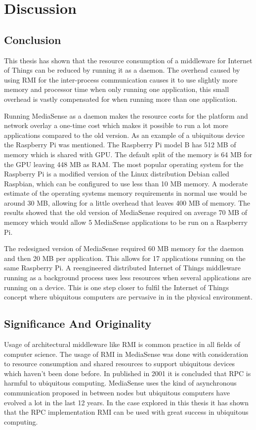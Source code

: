 \chapter{Discussion}

\section{Conclusion}
This thesis has shown that the resource consumption of a middleware for Internet of Things can be reduced by running it as a daemon. The overhead caused by using RMI for the inter-process communication causes it to use slightly more memory and processor time when only running one application, this small overhead is vastly compensated for when running more than one application. 

Running MediaSense as a daemon makes the resource costs for the platform and network overlay a one-time cost which makes it possible to run a lot more applications compared to the old version. As an example of a ubiquitous device the Raspberry Pi \cite{rpiweb} was mentioned. The Raspberry Pi model B has 512 MB of memory which is shared with GPU. The default split of the memory is 64 MB for the GPU leaving 448 MB as RAM. The most popular operating system for the Raspberry Pi is a modified version of the Linux distribution Debian called Raspbian, which can be configured to use less than 10 MB memory. A moderate estimate of the operating systems memory requirements in normal use would be around 30 MB, allowing for a little overhead that leaves 400 MB of memory. The results showed that the old version of MediaSense required on average 70 MB of memory which would allow 5 MediaSense applications to be run on a Raspberry Pi.

The redesigned version of MediaSense required 60 MB memory for the daemon and then 20 MB per application. This allows for 17 applications running on the same Raspberry Pi.
A reengineered distributed Internet of Things middleware running as a background process uses less resources when several applications are running on a device. This is one step closer to fulfil the Internet of Things concept where ubiquitous computers are pervasive in in the physical environment.

\section{Significance And Originality}
Usage of architectural middleware like RMI is common practice in all fields of computer science. The usage of RMI in MediaSense was done with consideration to resource consumption and shared resources to support ubiquitous devices which haven't been done before. In \cite{ubiqrpc} published in 2001 it is concluded that RPC is harmful to ubiquitous computing. MediaSense uses the kind of asynchronous communication proposed in \cite{ubiqrpc} between nodes but ubiquitous computers have evolved a lot in the last 12 years. In the case explored in this thesis it has shown that the RPC implementation RMI can be used with great success in ubiquitous computing.

